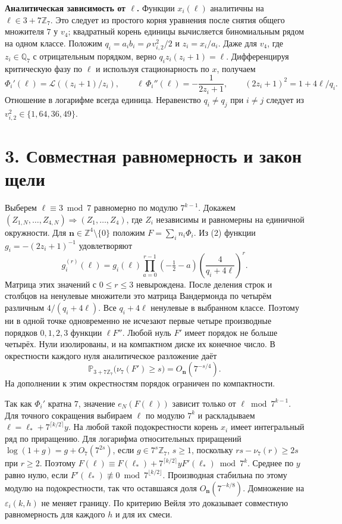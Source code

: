 \documentclass[11pt,a4paper]{article}
\newcommand{\Z}{\mathbb Z}
\newcommand{\sect}[1]{\section*{\sffamily\color{ink}#1}}
\newcommand{\subt}[1]{\par\medskip\noindent\textbf{#1.}\quad}
\newcommand{\Zp}{\mathbb Z_7}
\newcommand{\Qp}{\mathbb Q_7}
\begin{document}
\subt{Аналитическая зависимость от \(\ell\)}
Функции \(x_i(\ell)\) аналитичны на \(\ell\in3+7\Zp\). Это следует из простого корня уравнения после снятия общего множителя \(7\) у \(v_4\); квадратный корень единицы вычисляется биномиальным рядом на одном классе. Положим \(q_i=a_i b_i=\rho\,v_{i,2}^2/2\) и \(z_i=x_i/a_i\). Даже для \(v_4\), где \(z_i\in\Qp\) с отрицательным порядком, верно \(q_i z_i(z_i+1)=\ell\). Дифференцируя критическую фазу по \(\ell\) и используя стационарность по \(x\), получаем
\begin{equation}
          \Phi_i'(\ell)=\mathcal L((z_i+1)/z_i),\qquad
          \ell\,\Phi_i''(\ell)=-\frac1{2z_i+1},\qquad
                   (2z_i+1)^2=1+4\ell/q_i .                     \tag{2}
\end{equation}
Отношение в логарифме всегда единица. Неравенство \(q_i\ne q_j\) при \(i\ne j\) следует из \(v_{i,2}^2\in\{1,64,36,49\}\).
\newpage
\sect{3. Совместная равномерность и закон щели}
Выберем \(\ell\equiv3\bmod7\) равномерно по модулю \(7^{k-1}\). Докажем \((Z_{1,N},\ldots,Z_{4,N})\Rightarrow (Z_1,\ldots,Z_4)\), где \(Z_i\) независимы и равномерны на единичной окружности. Для \(\mathbf n\in\Z^4\setminus\{0\}\) положим \(F=\sum_i n_i\Phi_i\). Из (2) функции \(g_i=-(2z_i+1)^{-1}\) удовлетворяют
\[
 g_i^{(r)}(\ell)=g_i(\ell)
       \prod_{a=0}^{r-1}(-\tfrac12-a)\left(\frac4{q_i+4\ell}\right)^r .
\]
Матрица этих значений с \(0\le r\le3\) невырождена. После деления строк и столбцов на ненулевые множители это матрица Вандермонда по четырём различным \(4/(q_i+4\ell)\). Все \(q_i+4\ell\) ненулевые в выбранном классе. Поэтому ни в одной точке одновременно не исчезают первые четыре производные порядков \(0,1,2,3\) функции \(\ell F''\). Любой нуль \(F'\) имеет порядок не больше четырёх. Нули изолированы, и на компактном диске их конечное число. В окрестности каждого нуля аналитическое разложение даёт
\[
               \mathbb P_{3+7\Zp}\bigl(\nu_7(F')\ge s\bigr)
                              =O_{\mathbf n}(7^{-s/4}).
\]
На дополнении к этим окрестностям порядок ограничен по компактности.

Так как \(\Phi_i'\) кратна \(7\), значение \(e_N(F(\ell))\) зависит только от \(\ell\bmod7^{k-1}\). Для точного сокращения выбираем \(\ell\) по модулю \(7^k\) и раскладываем \(\ell=\ell_*+7^{\lceil k/2\rceil}y\). На любой такой подокрестности корень \(x_i\) имеет интегральный ряд по приращению. Для логарифма относительных приращений \(\log(1+g)=g+O_7(7^{2s})\), если \(g\in7^s\Zp\), \(s\ge1\), поскольку \(rs-\nu_7(r)\ge2s\) при \(r\ge2\). Поэтому \(F(\ell)\equiv F(\ell_*)+7^{\lceil k/2\rceil}yF'(\ell_*)\bmod7^k\). Среднее по \(y\) равно нулю, если \(F'(\ell_*)\not\equiv0\bmod7^{\lfloor k/2\rfloor}\). Производная стабильна по этому модулю на подокрестности, так что оставшаяся доля \(O_{\mathbf n}(7^{-k/8})\). Домножение на \(\varepsilon_i(k,h)\) не меняет границу. По критерию Вейля это доказывает совместную равномерность для каждого \(h\) и для их смеси.
\end{document}
